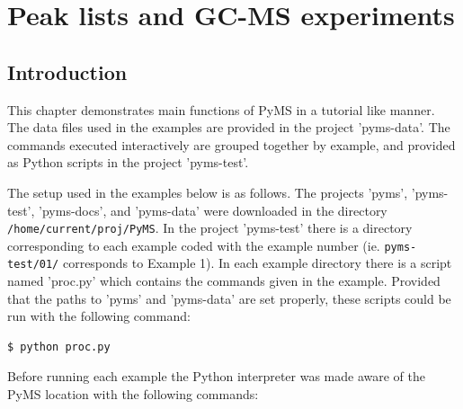

\chapter{Peak lists and GC-MS experiments}

\section{Introduction}

This chapter demonstrates main functions of PyMS in a tutorial like manner.
The data files used in the examples are provided in the project 'pyms-data'.
The commands executed interactively are grouped together by example, and
provided as Python scripts in the project 'pyms-test'.

The setup used in the examples below is as follows. The projects 'pyms',
'pyms-test', 'pyms-docs', and 'pyms-data' were downloaded in the directory
{\tt /home/current/proj/PyMS}. In the project 'pyms-test' there is a directory
corresponding to each example coded with the example number (ie.
{\tt pyms-test/01/} corresponds to Example 1). In each example directory
there is a script named 'proc.py' which contains the commands given in
the example. Provided that the paths to 'pyms' and 'pyms-data' are set
properly, these scripts could be run with the following command:

\begin{verbatim}
$ python proc.py
\end{verbatim}

Before running each example the Python interpreter was made aware of the
PyMS location with the following commands:


